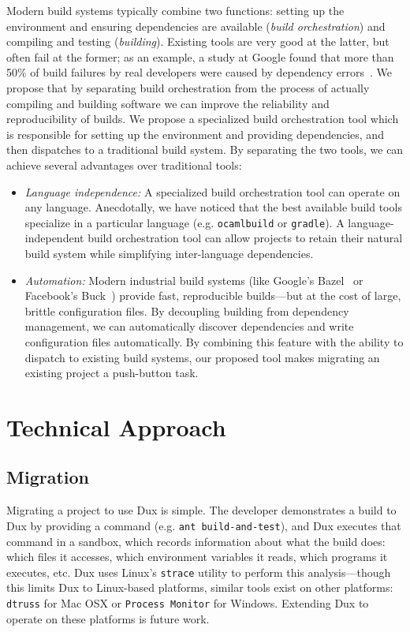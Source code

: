 \documentclass[10pt,conference]{IEEEtran}
\begin{document}
Modern build systems typically combine two functions:
setting up the environment and ensuring dependencies are available (\textit{build orchestration})
and compiling and testing (\textit{building}).
Existing tools are very good at the latter, but often fail at the former;
as an example, a study at Google found that more than 50\% of build failures
by real developers were caused by dependency errors~\cite{googlebuilderrors}.
We propose that by separating build orchestration from the process of actually
compiling and building software we can improve the reliability and reproducibility of builds.
We propose a specialized build orchestration tool which is responsible for setting up the environment
and providing dependencies, and then dispatches to a traditional build system.
By separating the two tools, we can achieve several advantages over traditional tools:
\begin{itemize}
\item{
\textit{Language independence:}
A specialized build orchestration tool can operate on any language.
Anecdotally, we have noticed that the best available build tools specialize
in a particular language (e.g. \texttt{ocamlbuild} or \texttt{gradle}).
A language-independent build orchestration tool can allow projects to retain
their natural build system while simplifying inter-language dependencies.
}
\item{
\textit{Automation:}
Modern industrial build systems (like Google's Bazel~\cite{blaze} or Facebook's Buck~\cite{buck}) provide fast,
reproducible builds---but at the cost of large, brittle configuration files.
By decoupling building from dependency management, we can automatically
discover dependencies and write configuration files automatically.
By combining this feature with the ability to dispatch to existing build systems,
our proposed tool makes migrating an existing project a push-button task.
}
\end{itemize}

\section{Technical Approach}

\subsection{Migration}

Migrating a project to use Dux is simple.
The developer demonstrates a build to Dux by providing a command (e.g. \texttt{ant build-and-test}),
and Dux executes that command in a sandbox, which records information about what the build does:
which files it accesses, which environment variables it reads, which programs it executes, etc.
Dux uses Linux's \texttt{strace} utility to perform this analysis---though this limits Dux to
Linux-based platforms, similar tools exist on other platforms: \texttt{dtruss} for Mac OSX or
\texttt{Process Monitor} for Windows. Extending Dux to operate on these platforms is future work.
\end{document}
